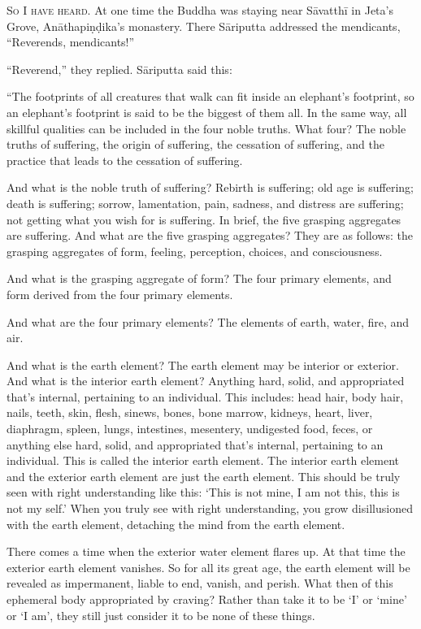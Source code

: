 \documentclass[12pt,openany]{book}%
\newcommand*{\scevam}[1]{\textsc{#1}}
\begin{document}
\scevam{So I have heard. }At one time the Buddha was staying near \textsanskrit{Sāvatthī} in Jeta’s Grove, \textsanskrit{Anāthapiṇḍika}’s monastery. There \textsanskrit{Sāriputta} addressed the mendicants, “Reverends, mendicants!” 

“Reverend,” they replied. \textsanskrit{Sāriputta} said this: 

“The footprints of all creatures that walk can fit inside an elephant’s footprint, so an elephant’s footprint is said to be the biggest of them all. In the same way, all skillful qualities can be included in the four noble truths. What four? The noble truths of suffering, the origin of suffering, the cessation of suffering, and the practice that leads to the cessation of suffering. 

And what is the noble truth of suffering? Rebirth is suffering; old age is suffering; death is suffering; sorrow, lamentation, pain, sadness, and distress are suffering; not getting what you wish for is suffering. In brief, the five grasping aggregates are suffering. And what are the five grasping aggregates? They are as follows: the grasping aggregates of form, feeling, perception, choices, and consciousness. 

And what is the grasping aggregate of form? The four primary elements, and form derived from the four primary elements. 

And what are the four primary elements? The elements of earth, water, fire, and air. 

And what is the earth element? The earth element may be interior or exterior. And what is the interior earth element? Anything hard, solid, and appropriated that’s internal, pertaining to an individual. This includes: head hair, body hair, nails, teeth, skin, flesh, sinews, bones, bone marrow, kidneys, heart, liver, diaphragm, spleen, lungs, intestines, mesentery, undigested food, feces, or anything else hard, solid, and appropriated that’s internal, pertaining to an individual. This is called the interior earth element. The interior earth element and the exterior earth element are just the earth element. This should be truly seen with right understanding like this: ‘This is not mine, I am not this, this is not my self.’ When you truly see with right understanding, you grow disillusioned with the earth element, detaching the mind from the earth element. 

There comes a time when the exterior water element flares up. At that time the exterior earth element vanishes. So for all its great age, the earth element will be revealed as impermanent, liable to end, vanish, and perish. What then of this ephemeral body appropriated by craving? Rather than take it to be ‘I’ or ‘mine’ or ‘I am’, they still just consider it to be none of these things. 
\end{document}
